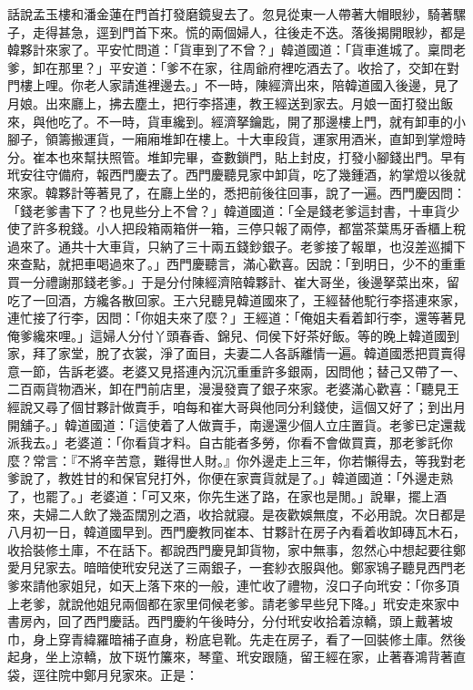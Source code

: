 \begin{showcontents}{}
話說孟玉樓和潘金蓮在門首打發磨鏡叟去了。忽見從東一人帶著大帽眼紗，騎著騾子，走得甚急，逕到門首下來。慌的兩個婦人，往後走不迭。落後揭開眼紗，都是韓夥計來家了。平安忙問道：「貨車到了不曾？」韓道國道：「貨車進城了。稟問老爹，卸在那里？」平安道：「爹不在家，往周爺府裡吃酒去了。收拾了，交卸在對門樓上哩。你老人家請進裡邊去。」不一時，陳經濟出來，陪韓道國入後邊，見了月娘。出來廳上，拂去塵土，把行李搭連，教王經送到家去。月娘一面打發出飯來，與他吃了。不一時，貨車纔到。經濟拏鑰匙，開了那邊樓上門，就有卸車的小腳子，領籌搬運貨，一廂廂堆卸在樓上。十大車段貨，運家用酒米，直卸到掌燈時分。崔本也來幫扶照管。堆卸完畢，查數鎖門，貼上封皮，打發小腳錢出門。早有玳安往守備府，報西門慶去了。西門慶聽見家中卸貨，吃了幾鍾酒，約掌燈以後就來家。韓夥計等著見了，在廳上坐的，悉把前後往回事，說了一遍。西門慶因問：「錢老爹書下了？也見些分上不曾？」韓道國道：「全是錢老爹這封書，十車貨少使了許多稅錢。小人把段箱兩箱併一箱，三停只報了兩停，都當茶葉馬牙香櫃上稅過來了。通共十大車貨，只納了三十兩五錢鈔銀子。老爹接了報單，也沒差巡攔下來查點，就把車喝過來了。」西門慶聽言，滿心歡喜。因說：「到明日，少不的重重買一分禮謝那錢老爹。」于是分付陳經濟陪韓夥計、崔大哥坐，後邊拏菜出來，留吃了一回酒，方纔各散回家。王六兒聽見韓道國來了，王經替他駝行李搭連來家，連忙接了行李，因問：「你姐夫來了麼？」王經道：「俺姐夫看着卸行李，還等著見俺爹纔來哩。」這婦人分付丫頭春香、錦兒、伺侯下好茶好飯。等的晚上韓道國到家，拜了家堂，脫了衣裳，淨了面目，夫妻二人各訴離情一遍。韓道國悉把買賣得意一節，告訴老婆。老婆又見搭連內沉沉重重許多銀兩，因問他；替己又帶了一、二百兩貨物酒米，卸在門前店里，漫漫發賣了銀子來家。老婆滿心歡喜：「聽見王經說又尋了個甘夥計做賣手，咱每和崔大哥與他同分利錢使，這個又好了；到出月開舖子。」韓道國道：「這使着了人做賣手，南邊還少個人立庄置貨。老爹已定還裁派我去。」老婆道：「你看貨才料。自古能者多勞，你看不會做買賣，那老爹託你麼？常言：『不將辛苦意，難得世人財。』你外邊走上三年，你若懶得去，等我對老爹說了，教姓甘的和保官兒打外，你便在家賣貨就是了。」韓道國道：「外邊走熟了，也罷了。」老婆道：「可又來，你先生迷了路，在家也是閒。」說畢，擺上酒來，夫婦二人飲了幾盃闊別之酒，收拾就寢。是夜歡娛無度，不必用說。次日都是八月初一日，韓道國早到。西門慶教同崔本、甘夥計在房子內看着收卸磚瓦木石，收拾裝修土庫，不在話下。都說西門慶見卸貨物，家中無事，忽然心中想起要往鄭愛月兒家去。暗暗使玳安兒送了三兩銀子，一套紗衣服與他。鄭家鴇子聽見西門老爹來請他家姐兒，如天上落下來的一般，連忙收了禮物，沒口子向玳安：「你多頂上老爹，就說他姐兒兩個都在家里伺候老爹。請老爹早些兒下降。」玳安走來家中書房內，回了西門慶話。西門慶約午後時分，分付玳安收拾着涼轎，頭上戴著坡巾，身上穿青緯羅暗補子直身，粉底皂靴。先走在房子，看了一回裝修土庫。然後起身，坐上涼轎，放下斑竹簾來，琴童、玳安跟隨，留王經在家，止著春鴻背著直袋，逕往院中鄭月兒家來。正是：


\end{showcontents}
